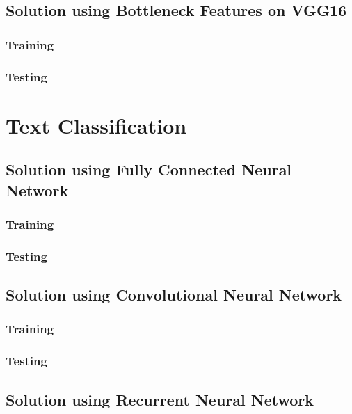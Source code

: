 \documentclass[10pt,twoside,a4paper,openany]{memoir}
\begin{document}
\section{Solution using Bottleneck Features on VGG16}
\subsection{Training}


\subsection{Testing}


\chapter{Text Classification}
\section{Solution using Fully Connected Neural Network}
\subsection{Training}


\subsection{Testing}


\section{Solution using Convolutional Neural Network}
\subsection{Training}


\subsection{Testing}


\section{Solution using Recurrent Neural Network}
\end{document}
